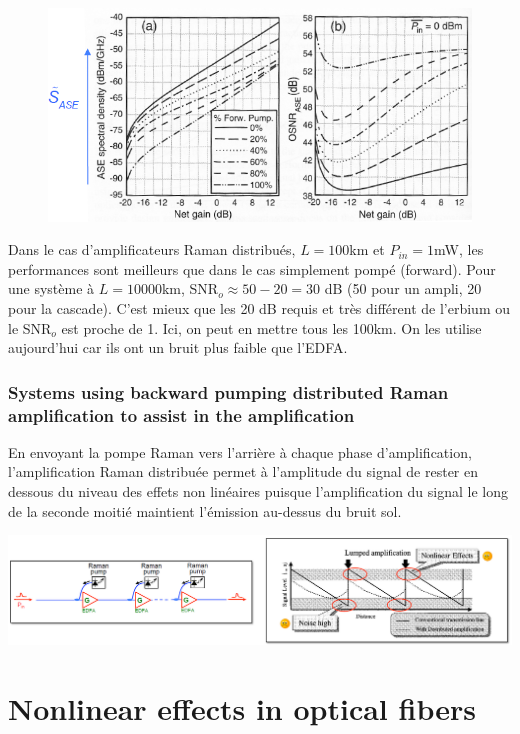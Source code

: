 \newpage
	\begin{figure}
	\includegraphics[scale=0.35]{ch6/image22}
	\end{figure}
Dans le cas d'amplificateurs Raman distribués, $L=100$km et $P_{in}=1$mW, les performances sont meilleurs 
que dans le cas simplement pompé (forward). Pour une système à $L=10000$km, SNR$_o\approx50-20=30$ dB (50 pour
un ampli, 20 pour la cascade). C'est mieux que les 20 dB requis et très différent de l'erbium ou le SNR$_o$ 
est proche de 1.  Ici, on peut en mettre tous les 100km. On les utilise aujourd'hui car ils ont un bruit
plus faible que l'EDFA.


\subsubsection{Systems using backward pumping distributed Raman amplification to assist in the amplification}
En envoyant la pompe Raman vers l'arrière à chaque phase d'amplification, l'amplification Raman distribuée permet à l'amplitude du signal de rester en dessous du niveau des effets non linéaires puisque l'amplification du signal le long de la seconde moitié maintient l'émission au-dessus du bruit sol.
\begin{center}
	\includegraphics[scale=0.3]{ch6/image23}
\end{center}

\section{Nonlinear effects in optical fibers}
